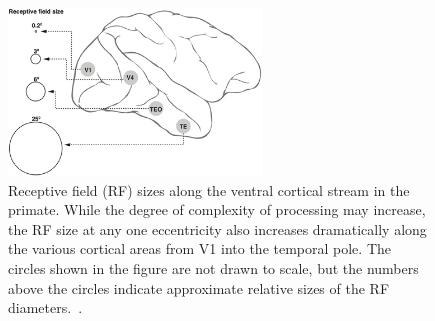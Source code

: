 \begin{figure}[h!]
	\centering
	\includegraphics[width=0.6\textwidth]{pics_report/rf.jpg}
	\caption{Receptive field (RF) sizes along the ventral cortical stream in the primate. While the degree of complexity of processing may increase, the RF size at any one eccentricity also increases dramatically along the various cortical areas from V1 into the temporal pole. The circles shown in the figure are not drawn to scale, but the numbers above the circles indicate approximate relative sizes of the RF diameters.~\cite{vidyasagar2013reading}.}
	\label{Fig:Hir1}
\end{figure}

%
%

